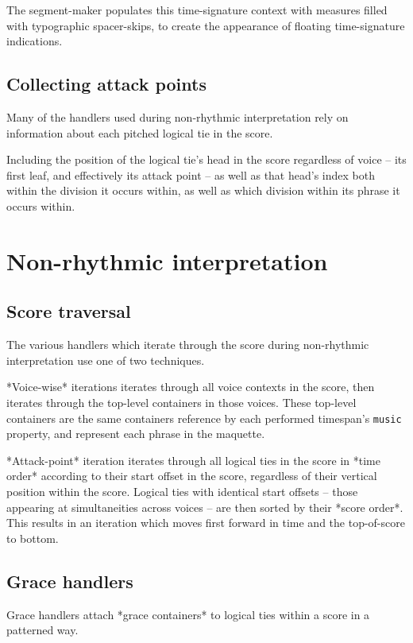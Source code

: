 The segment-maker populates this time-signature context with measures filled
with typographic spacer-skips, to create the appearance of floating
time-signature indications.

\subsection{Collecting attack points}

Many of the handlers used during non-rhythmic interpretation rely on
information about each pitched logical tie in the score.

Including the position of the logical tie's head in the score regardless of
voice -- its first leaf, and effectively its attack point -- as well as that
head's index both within the division it occurs within, as well as which
division within its phrase it occurs within.

\section{Non-rhythmic interpretation}

\subsection{Score traversal}

The various handlers which iterate through the score during non-rhythmic
interpretation use one of two techniques.

*Voice-wise* iterations iterates through all voice contexts in the score, then
iterates through the top-level containers in those voices. These top-level
containers are the same containers reference by each performed timespan's
\texttt{music} property, and represent each phrase in the maquette.

*Attack-point* iteration iterates through all logical ties in the score in
*time order* according to their start offset in the score, regardless of their
vertical position within the score. Logical ties with identical start offsets
-- those appearing at simultaneities across voices -- are then sorted by their
*score order*. This results in an iteration which moves first forward in time
and the top-of-score to bottom.

\subsection{Grace handlers}

Grace handlers attach *grace containers* to logical ties within a score in a
patterned way.

